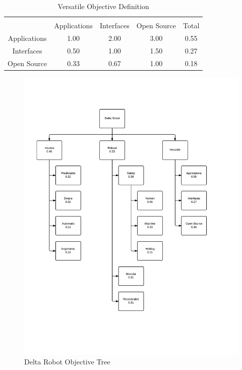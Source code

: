 \documentclass[11pt]{report}
\begin{document}
\begin{table}[ht] 
	\caption{Versatile Objective Definition}
	\label{table:versatile}
	\centering 
	\begin{tabular}{c c c c c} 
		\hline\hline \\
		 			& Applications& Interfaces	& Open Source	& Total\\ 
		Applications	& 1.00 		& 2.00		& 3.00 		& 0.55 \\ 
		Interfaces	& 0.50		& 1.00 		& 1.50		& 0.27 \\ 
		Open Source 	& 0.33 		& 0.67 		& 1.00 		& 0.18 \\ 
	\end{tabular} 
\end{table}

\begin{figure}[p]
	\centering
	\includegraphics[width=.8\textwidth]{objectivetree.png}
	\caption{Delta Robot Objective Tree}
	\label{fig:objectivetree}
\end{figure}

\newpage
\end{document}
